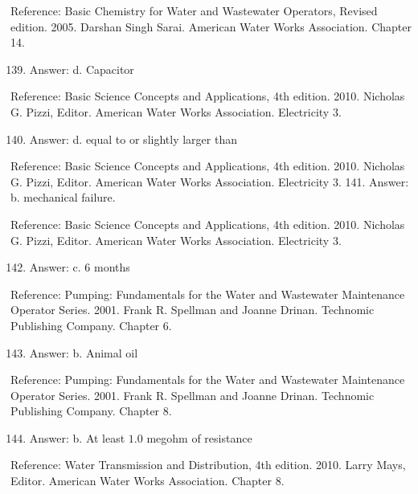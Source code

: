 \documentclass[10pt]{article}
\begin{document}
Reference: Basic Chemistry for Water and Wastewater Operators, Revised edition. 2005. Darshan Singh Sarai. American Water Works Association. Chapter 14.

\begin{enumerate}
  \setcounter{enumi}{138}
  \item Answer: d. Capacitor
\end{enumerate}

Reference: Basic Science Concepts and Applications, 4th edition. 2010. Nicholas G. Pizzi, Editor. American Water Works Association. Electricity 3.

\begin{enumerate}
  \setcounter{enumi}{139}
  \item Answer: d. equal to or slightly larger than
\end{enumerate}

Reference: Basic Science Concepts and Applications, 4th edition. 2010. Nicholas G. Pizzi, Editor. American Water Works Association. Electricity 3. 141. Answer: b. mechanical failure.

Reference: Basic Science Concepts and Applications, 4th edition. 2010. Nicholas G. Pizzi, Editor. American Water Works Association. Electricity 3.

\begin{enumerate}
  \setcounter{enumi}{141}
  \item Answer: c. 6 months
\end{enumerate}

Reference: Pumping: Fundamentals for the Water and Wastewater Maintenance Operator Series. 2001. Frank R. Spellman and Joanne Drinan. Technomic Publishing Company. Chapter 6.

\begin{enumerate}
  \setcounter{enumi}{142}
  \item Answer: b. Animal oil
\end{enumerate}

Reference: Pumping: Fundamentals for the Water and Wastewater Maintenance Operator Series. 2001. Frank R. Spellman and Joanne Drinan. Technomic Publishing Company. Chapter 8.

\begin{enumerate}
  \setcounter{enumi}{143}
  \item Answer: b. At least $1.0$ megohm of resistance
\end{enumerate}

Reference: Water Transmission and Distribution, 4th edition. 2010. Larry Mays, Editor. American Water Works Association. Chapter 8.
\end{document}
